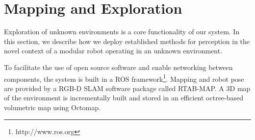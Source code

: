 \documentclass[conference]{IEEEtran}
\begin{document}
\section{Mapping and Exploration}
\label{sec:exploration}
%


Exploration of unknown environments is a core functionality of our system. In this section, we describe how we deploy established methods for perception in the novel context of a modular robot operating in an unknown environment.

To facilitate the use of open source software and enable networking between components, the system is built in a ROS framework\footnote{http://www.ros.org}. Mapping and robot pose are provided by a RGB-D SLAM software package called RTAB-MAP\cite{rtabmap}. A 3D map of the environment is incrementally built and stored in an efficient octree-based volumetric map using Octomap\cite{octomap}.
\end{document}
